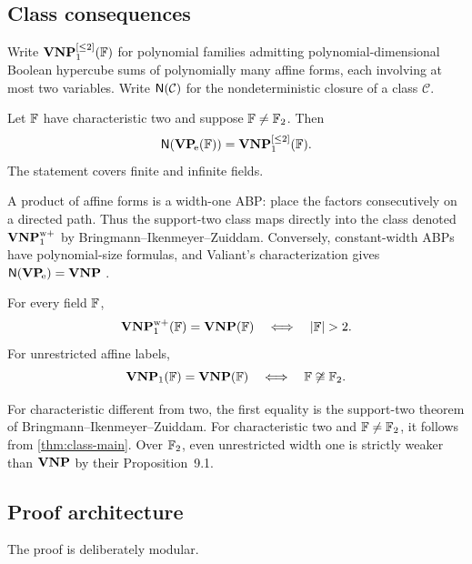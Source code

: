 \subsection{Class consequences}

Write \(\mathbf{VNP}_{1}^{[\le 2]}(\mathbb{F})\) for polynomial families admitting polynomial-dimensional Boolean
hypercube sums of polynomially many affine forms, each involving at most two variables.
Write \(\mathsf{N}(\mathcal C)\) for the nondeterministic closure of a class \(\mathcal C\).

\begin{theorem}\label{thm:class-main}
Let \(\mathbb{F}\) have characteristic two and suppose \(\mathbb{F}\neq\mathbb{F}_2\).  Then
\[
   \mathsf{N}(\mathbf{VP}_{\!\mathrm e}(\mathbb{F}))=\mathbf{VNP}_{1}^{[\le 2]}(\mathbb{F}).
\]
The statement covers finite and infinite fields.
\end{theorem}

A product of affine forms is a width-one ABP: place the factors consecutively on a directed
path.  Thus the support-two class maps directly into the class denoted
\(\mathbf{VNP}_{1}^{\mathrm{w}+}\) by Bringmann--Ikenmeyer--Zuiddam.  Conversely, constant-width ABPs have
polynomial-size formulas, and Valiant's characterization gives
\(\mathsf{N}(\mathbf{VP}_{\!\mathrm e})=\mathbf{VNP}\) \cite{Valiant1980,BringmannIkenmeyerZuiddam2018}.

\begin{corollary}\label{cor:classification}
For every field \(\mathbb{F}\),
\[
  \VNPwplus(\F)=\VNP(\F)
  \quad\Longleftrightarrow\quad |\F|>2.
\]
For unrestricted affine labels,
\[
  \mathbf{VNP}_{1}(\mathbb{F})=\mathbf{VNP}(\mathbb{F})
  \quad\Longleftrightarrow\quad \mathbb{F}\not\cong\mathbb{F}_2.
\]
\end{corollary}

For characteristic different from two, the first equality is the support-two theorem of
Bringmann--Ikenmeyer--Zuiddam.  For characteristic two and \(\mathbb{F}\neq\mathbb{F}_2\), it follows from
\cref{thm:class-main}.  Over \(\mathbb{F}_2\), even unrestricted width one is strictly weaker than
\(\mathbf{VNP}\) by their Proposition~9.1.

\subsection{Proof architecture}

The proof is deliberately modular.

